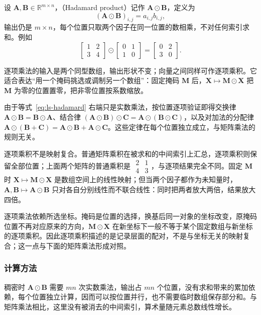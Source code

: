设 $\bm A,\bm B\in\mathbb R^{m\times n}$，（Hadamard product）记作 $\bm A\odot\bm B$，定义为
\begin{equation}
 (\bm A\odot\bm B)_{i,j}=a_{i,j}b_{i,j},
 \label{eq:ls-hadamard}
\end{equation}
输出仍是 $m\times n$，每个位置只取两个因子在同一位置的数相乘，不对任何索引求和。例如
\[
 \begin{bmatrix}1&2\\3&4\end{bmatrix}
 \odot
 \begin{bmatrix}0&1\\1&0\end{bmatrix}
 =
 \begin{bmatrix}0&2\\3&0\end{bmatrix}.
\]

逐项乘法的输入是两个同型数组，输出形状不变；向量之间同样可作逐项乘积。它适合表达“用一个掩码挑选或调制另一个数组”：固定掩码 $\bm M$ 后，$\bm X\mapsto\bm M\odot\bm X$ 把 $\bm M$ 为零的位置置零，把非零位置按系数缩放。

由于等式~\eqref{eq:ls-hadamard} 右端只是实数乘法，按位置逐项验证即得交换律 $\bm A\odot\bm B=\bm B\odot\bm A$、结合律 $(\bm A\odot\bm B)\odot\bm C=\bm A\odot(\bm B\odot\bm C)$，以及对加法的分配律 $\bm A\odot(\bm B+\bm C)=\bm A\odot\bm B+\bm A\odot\bm C$。这些定律在每个位置独立成立，与矩阵乘法的规则无关。

逐项乘积不是映射复合。普通矩阵乘积在被求和的中间索引上汇总，逐项乘积则保留全部位置；上面两个矩阵的普通乘积是 $\begin{smallmatrix}2&1\\4&3\end{smallmatrix}$，与逐项结果完全不同。固定 $\bm M$ 时 $\bm X\mapsto\bm M\odot\bm X$ 是数组空间上的线性映射；但当两个因子都作为未知量时，$\bm A,\bm B\mapsto\bm A\odot\bm B$ 只对各自分别线性而不联合线性：同时把两者放大两倍，结果放大四倍。

逐项乘法依赖所选坐标。掩码是位置的选择，换基后同一对象的坐标改变，原掩码位置不再对应原来的方向，$\bm M\odot\bm X$ 在新坐标下一般不等于某个固定数组与新坐标的逐项乘积。因此逐项乘积描述的是记录层面的配对，不是与坐标无关的映射复合；这一点与下面的矩阵乘法形成对照。

\subsubsection{计算方法}

稠密时 $\bm A\odot\bm B$ 需要 $mn$ 次实数乘法，输出占 $mn$ 个位置，没有求和带来的累加依赖，每个位置独立计算，因而可以按位置并行，也不需要临时数组保存部分和。与矩阵乘法相比，这里没有被消去的中间索引，算术量随元素总数线性增长。

